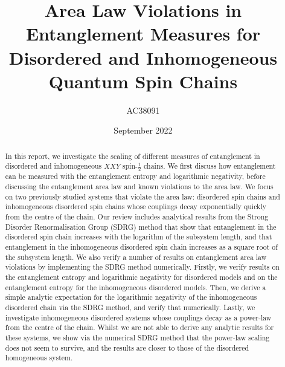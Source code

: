 \documentclass[11pt]{article}
\title{Area Law Violations in Entanglement Measures for Disordered and Inhomogeneous Quantum Spin Chains}
\author{AC38091}
\date{September 2022}
\begin{document}
\maketitle

\begin{abstract}

In this report, we investigate the scaling of different measures of entanglement in disordered and inhomogeneous $XXY$ spin-$\frac{1}{2}$ chains. We first discuss how entanglement can be measured with the entanglement entropy and logarithmic negativity, before discussing the entanglement area law and known violations to the area law. We focus on two previously studied systems that violate the area law: disordered spin chains and inhomogeneous disordered spin chains whose couplings decay exponentially quickly from the centre of the chain. Our review includes analytical results from the Strong Disorder Renormalisation Group (SDRG) method that show that entanglement in the disordered spin chain increases with the logarithm of the subsystem length, and that entanglement in the inhomogeneous disordered spin chain increases as a square root of the subsystem length. We also verify a number of results on entanglement area law violations by implementing the SDRG method numerically. Firstly, we verify results on the entanglement entropy and logarithmic negativity for disordered models and on the entanglement entropy for the inhomogeneous disordered models. Then, we derive a simple analytic expectation for the logarithmic negativity of the inhomogeneous disordered chain via the SDRG method, and verify that numerically. Lastly, we investigate inhomogeneous disordered systems whose couplings decay as a power-law from the centre of the chain. Whilst we are not able to derive any analytic results for these systems, we show via the numerical SDRG method that the power-law scaling does not seem to survive, and the results are closer to those of the disordered homogeneous system.
\end{abstract}

\tableofcontents


%








\appendix

%

%
%
\printbibliography
\end{document}
